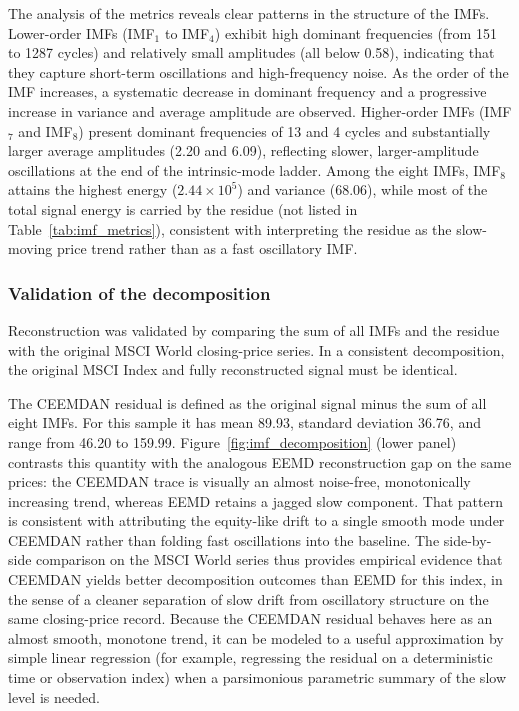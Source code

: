 \documentclass[11pt,a4paper]{article}
\begin{document}
The analysis of the metrics reveals clear patterns in the structure of the IMFs. Lower-order IMFs (IMF$_1$ to IMF$_4$) exhibit high dominant frequencies (from 151 to 1287 cycles) and relatively small amplitudes (all below 0.58), indicating that they capture short-term oscillations and high-frequency noise. As the order of the IMF increases, a systematic decrease in dominant frequency and a progressive increase in variance and average amplitude are observed. Higher-order IMFs (IMF$_7$ and IMF$_8$) present dominant frequencies of 13 and 4 cycles and substantially larger average amplitudes (2.20 and 6.09), reflecting slower, larger-amplitude oscillations at the end of the intrinsic-mode ladder. Among the eight IMFs, IMF$_8$ attains the highest energy ($2.44 \times 10^5$) and variance (68.06), while most of the total signal energy is carried by the residue (not listed in Table~\ref{tab:imf_metrics}), consistent with interpreting the residue as the slow-moving price trend rather than as a fast oscillatory IMF.

\subsubsection{Validation of the decomposition}

Reconstruction was validated by comparing the sum of all IMFs and the residue with the original MSCI World closing-price series. In a consistent decomposition, the original MSCI Index and fully reconstructed signal must be identical.

The CEEMDAN residual is defined as the original signal minus the sum of all eight IMFs. For this sample it has mean 89.93, standard deviation 36.76, and range from 46.20 to 159.99. Figure~\ref{fig:imf_decomposition} (lower panel) contrasts this quantity with the analogous EEMD reconstruction gap on the same prices: the CEEMDAN trace is visually an almost noise-free, monotonically increasing trend, whereas EEMD retains a jagged slow component. That pattern is consistent with attributing the equity-like drift to a single smooth mode under CEEMDAN rather than folding fast oscillations into the baseline. The side-by-side comparison on the MSCI World series thus provides empirical evidence that CEEMDAN yields better decomposition outcomes than EEMD for this index, in the sense of a cleaner separation of slow drift from oscillatory structure on the same closing-price record. Because the CEEMDAN residual behaves here as an almost smooth, monotone trend, it can be modeled to a useful approximation by simple linear regression (for example, regressing the residual on a deterministic time or observation index) when a parsimonious parametric summary of the slow level is needed.
\end{document}
